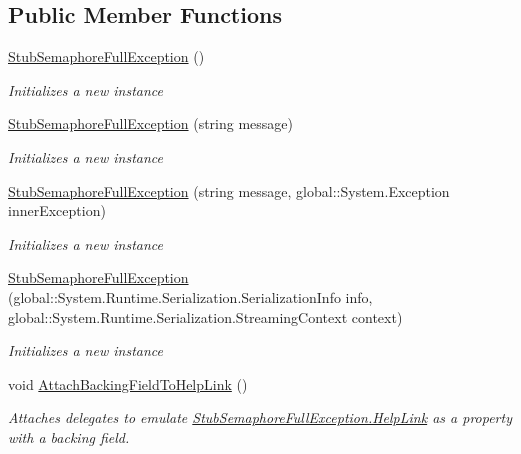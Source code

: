 \subsection*{Public Member Functions}
\begin{DoxyCompactItemize}
\item 
\hyperlink{class_system_1_1_threading_1_1_fakes_1_1_stub_semaphore_full_exception_a46a39927c55ef31c54b574b30c1ddd70}{Stub\-Semaphore\-Full\-Exception} ()
\begin{DoxyCompactList}\small\item\em Initializes a new instance\end{DoxyCompactList}\item 
\hyperlink{class_system_1_1_threading_1_1_fakes_1_1_stub_semaphore_full_exception_a30468d6305986110e301d021ed042d18}{Stub\-Semaphore\-Full\-Exception} (string message)
\begin{DoxyCompactList}\small\item\em Initializes a new instance\end{DoxyCompactList}\item 
\hyperlink{class_system_1_1_threading_1_1_fakes_1_1_stub_semaphore_full_exception_af9afdf53a739da69c1bcd3635328e5b6}{Stub\-Semaphore\-Full\-Exception} (string message, global\-::\-System.\-Exception inner\-Exception)
\begin{DoxyCompactList}\small\item\em Initializes a new instance\end{DoxyCompactList}\item 
\hyperlink{class_system_1_1_threading_1_1_fakes_1_1_stub_semaphore_full_exception_ac3e65d56c5d4b8d2ce82752a88c1deeb}{Stub\-Semaphore\-Full\-Exception} (global\-::\-System.\-Runtime.\-Serialization.\-Serialization\-Info info, global\-::\-System.\-Runtime.\-Serialization.\-Streaming\-Context context)
\begin{DoxyCompactList}\small\item\em Initializes a new instance\end{DoxyCompactList}\item 
void \hyperlink{class_system_1_1_threading_1_1_fakes_1_1_stub_semaphore_full_exception_a678345cfd1109309b8370b839de54176}{Attach\-Backing\-Field\-To\-Help\-Link} ()
\begin{DoxyCompactList}\small\item\em Attaches delegates to emulate \hyperlink{class_system_1_1_threading_1_1_fakes_1_1_stub_semaphore_full_exception_a82c520c74e28757fba467d08f887a8bf}{Stub\-Semaphore\-Full\-Exception.\-Help\-Link} as a property with a backing field.\end{DoxyCompactList}\item 

\end{DoxyCompactItemize}
